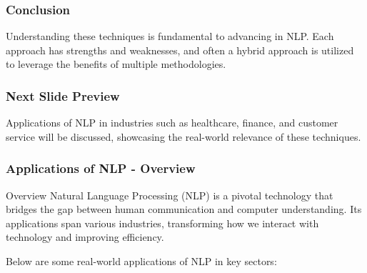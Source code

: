 \documentclass{beamer}
\begin{document}
\begin{frame}[fragile]
    \frametitle{Conclusion}
    Understanding these techniques is fundamental to advancing in NLP. Each approach has strengths and weaknesses, and often a hybrid approach is utilized to leverage the benefits of multiple methodologies.
\end{frame}

\begin{frame}[fragile]
    \frametitle{Next Slide Preview}
    Applications of NLP in industries such as healthcare, finance, and customer service will be discussed, showcasing the real-world relevance of these techniques.
\end{frame}

\begin{frame}[fragile]
    \frametitle{Applications of NLP - Overview}
    \begin{block}{Overview}
        Natural Language Processing (NLP) is a pivotal technology that bridges the gap between human communication and computer understanding. Its applications span various industries, transforming how we interact with technology and improving efficiency.
    \end{block}
    Below are some real-world applications of NLP in key sectors:
\end{frame}
\end{document}
